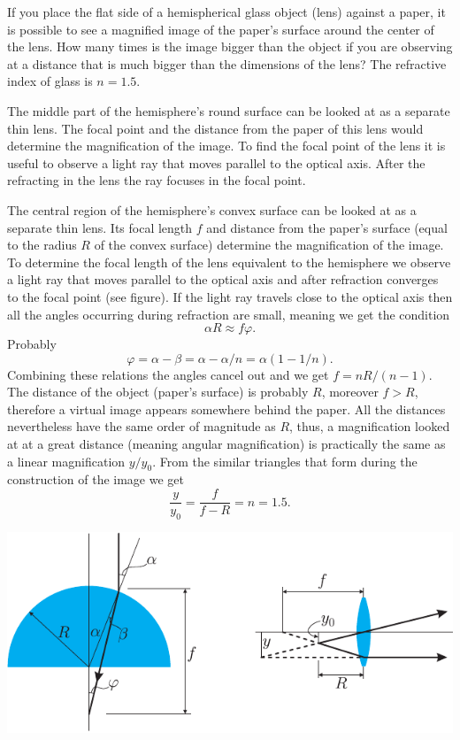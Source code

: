 {\ifEngStatement
If you place the flat side of a hemispherical glass object (lens) against a paper, it is possible to see a magnified image of the paper’s surface around the center of the lens. How many times is the image bigger than the object if you are observing at a distance that is much bigger than the dimensions of the lens? The refractive index of glass is $n=\num{1.5}$.
\fi


\ifEngHint
The middle part of the hemisphere’s round surface can be looked at as a separate thin lens. The focal point and the distance from the paper of this lens would determine the magnification of the image. To find the focal point of the lens it is useful to observe a light ray that moves parallel to the optical axis. After the refracting in the lens the ray focuses in the focal point.
\fi


\ifEngSolution
The central region of the hemisphere’s convex surface can be looked at as a separate thin lens. Its focal length $f$ and distance from the paper’s surface (equal to the radius $R$ of the convex surface) determine the magnification of the image. To determine the focal length of the lens equivalent to the hemisphere we observe a light ray that moves parallel to the optical axis and after refraction converges to the focal point (see figure). If the light ray travels close to the optical axis then all the angles occurring during refraction are small, meaning we get the condition
\[
\alpha R\approx f\varphi.
\]
Probably
\[
\varphi = \alpha - \beta=\alpha-\alpha/n=\alpha(1-1/n).
\]
Combining these relations the angles cancel out and we get $f=nR/(n-1)$. The distance of the object (paper’s surface) is probably $R$, moreover $f > R$, therefore a virtual image appears somewhere behind the paper. All the distances nevertheless have the same order of magnitude as $R$, thus, a magnification looked at at a great distance (meaning angular magnification) is practically the same as a linear magnification $y/y_0$. From the similar triangles that form during the construction of the image we get
\[
\frac{y}{y_0}=\frac{f}{f-R}=n=\num{1.5}.
\]  
\begin{center}
	\includegraphics[scale=1.2]{2016-v3g-06-luup-lah}
\end{center}
\fi
}